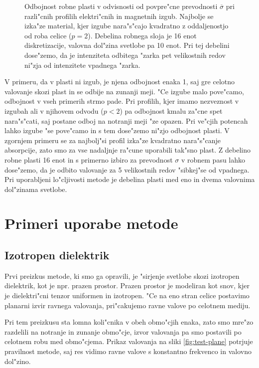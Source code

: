 \documentclass[12pt,twoside,openright,final]{report}
\begin{document}
\begin{figure}[!htbp]
 
 \caption{Odbojnost robne plasti v odvisnosti od povpre"cne prevodnosti $\overline{\sigma}$ pri razli"cnih profilih elektri"cnih in magnetnih izgub. Najbolje se izka"ze material, kjer izgube nara"s"cajo kvadratno z oddaljenostjo od roba celice ($p=2$). Debelina robnega sloja je 16 enot diskretizacije, valovna dol"zina svetlobe pa 10 enot. Pri tej debelini dose"zemo, da je intenziteta odbitega "zarka pet velikostnih redov ni"zja od intenzitete vpadnega "zarka. }
 \label{fig:test-absorption}
\end{figure}

V primeru, da v plasti ni izgub, je njena odbojnost enaka 1, saj gre celotno valovanje skozi plast in se odbije na zunanji meji. 
"Ce izgube malo pove"camo, odbojnost v vseh primerih strmo pade. 
Pri profilih, kjer imamo nezveznost v izgubah ali v njihovem odvodu ($p<2$) pa odbojnost kmalu za"cne spet nara"s"cati, saj postane odboj na notranji meji "ze opazen.
Pri ve"cjih potencah lahko izgube "se pove"camo in s tem dose"zemo ni"zjo odbojnost plasti. 
V zgornjem primeru se za najbolj"si profil izka"ze kvadratno nara"s"canje absorpcije, zato smo za vse nadaljnje ra"cune uporabili tak"sno plast. 
Z debelino robne plasti 16 enot in s primerno izbiro za prevodnost $\sigma$ v robnem pasu lahko dose"zemo, da je odbito valovanje za 5 velikostnih redov "sibkej"se od vpadnega. 
Pri uporabljeni lo"cljivosti metode je debelina plasti med eno in dvema valovnima dol"zinama svetlobe. 



\chapter{Primeri uporabe metode}

\section{Izotropen dielektrik}
Prvi preizkus metode, ki smo ga opravili, je "sirjenje svetlobe skozi izotropen dielektrik, kot je npr. prazen prostor. 
Prazen prostor je modeliran kot snov, kjer je dielektri"cni tenzor uniformen in izotropen. 
"Ce na eno stran celice postavimo planarni izvir ravnega valovanja, pri"cakujemo ravne valove po celotnem mediju. 

Pri tem preizkusu sta lomna koli"cnika v obeh obmo"cjih enaka, zato smo mre"zo razdelili na notranje in zunanje obmo"cje, izvor valovanja pa smo postavili po celotnem robu med obmo"cjema. 
Prikaz valovanja na sliki \ref{fig:test-plane} potrjuje pravilnost metode, saj res vidimo ravne valove s konstantno frekvenco in valovno dol"zino. 
\end{document}
